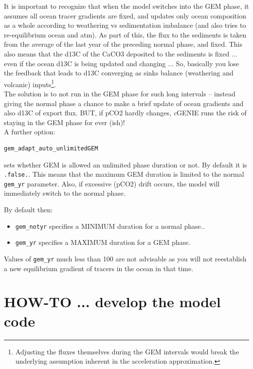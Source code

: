 \documentclass[11pt,fleqn]{book} %
\begin{document}
It is important to recognize that when the model switches into the GEM phase, it assumes all ocean tracer gradients are fixed, and updates only ocean composition as a whole according to weathering vs sedimentation imbalance (and also tries to re-equilibrium ocean and atm). As part of this, the flux to the sediments is taken from the average of the last year of the preceding normal phase, and fixed. This also means that the d13C of the CaCO3 deposited to the sediments is fixed ... even if the ocean d13C is being updated and changing ... So, basically you lose the feedback that leads to d13C converging as sinks balance (weathering and volcanic) inputs\footnote{Adjusting the fluxes themselves during the GEM intervals would break the underlying assumption inherent in the acceleration approximation.}.
\\The solution is to not run in the GEM phase for such long intervals -- instead giving the normal phase a chance to make a brief update of ocean gradients and also d13C of export flux. BUT, if pCO2 hardly changes, \textit{c}GENIE runs the risk of staying in the GEM phase for ever (ish)!
\\ A further option:
\vspace{-1mm}\begin{verbatim}
gem_adapt_auto_unlimitedGEM
\end{verbatim}\vspace{-1mm}
sets whether GEM is allowed an unlimited phase duration or not. By default it is \texttt{.false.}. This means that the maximum GEM duration is limited to the normal \texttt{gem\_yr} parameter. Also, if excessive (pCO2) drift occurs, the model will immediately switch to the normal phase.

By default then:
\begin{itemize}
        \item \texttt{gem\_notyr} specifies a MINIMUM duration for a normal phase..
        \item \texttt{gem\_yr} specifies a MAXIMUM duration for a GEM phase.
\end{itemize}
Values of \texttt{gem\_yr} much less than 100 are not advisable as you will not reestablish a new equilibrium gradient of tracers in the ocean in that time.


\newpage


\section{HOW-TO ... develop the model code}
\end{document}
